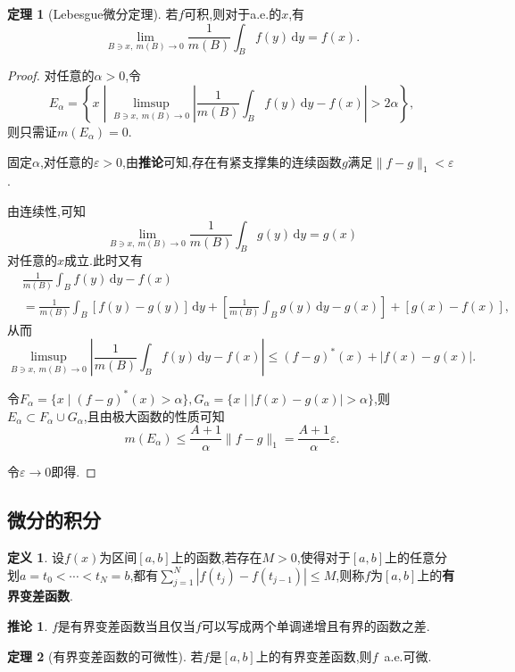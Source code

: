 \documentclass{ctexart}
\theoremstyle{definition}
\newtheorem{definition}{定义}
\newtheorem{theorem}{定理}
\newtheorem{corollary}{推论}
\theoremstyle{remark}
\begin{document}
	\begin{theorem}[Lebesgue微分定理]
		若$f$可积,则对于a.e.的$x$,有
		$$\lim_{B\ni x,\ m(B)\to 0}{\frac{1}{m(B)}\int_B{f(y)\,\mathrm{d}y}}=f(x).$$
	\end{theorem}
	\begin{proof}
		对任意的$\alpha>0$,令
		$$E_\alpha=\left\{x\middle|\limsup_{B\ni x,\ m(B)\to 0}{\left|\frac{1}{m(B)}\int_B{f(y)\,\mathrm{d}y}-f(x)\right|}>2\alpha\right\},$$
		则只需证$m(E_\alpha)=0$.
		
		固定$\alpha$,对任意的$\varepsilon>0$,由\textbf{推论\label{cor_Lp_dense_set}}可知,存在有紧支撑集的连续函数$g$满足$\|f-g\|_1<\varepsilon$.
		
		由连续性,可知
		$$\lim_{B\ni x,\ m(B)\to 0}{\frac{1}{m(B)}\int_B{g(y)\,\mathrm{d}y}}=g(x)$$
		对任意的$x$成立.此时又有
		\begin{align*}
			& \frac{1}{m(B)}\int_B{f(y)\,\mathrm{d}y}-f(x) \\
			& = \frac{1}{m(B)}\int_B{[f(y)-g(y)]\,\mathrm{d}y}
			+ \left[\frac{1}{m(B)}\int_B{g(y)\,\mathrm{d}y}-g(x)\right]
			+ [g(x)-f(x)],
		\end{align*}
		从而
		$$\limsup_{B\ni x,\ m(B)\to 0}{\left|\frac{1}{m(B)}\int_B{f(y)\,\mathrm{d}y}-f(x)\right|}
		\le (f-g)^*(x) + |f(x)-g(x)|.$$
		
		令$F_\alpha=\{x\mid(f-g)^*(x)>\alpha\},G_\alpha=\{x\mid|f(x)-g(x)|>\alpha\}$,则$E_\alpha\subset F_\alpha\cup G_\alpha$,且由极大函数的性质可知
		$$m(E_\alpha)\le\frac{A+1}{\alpha}\|f-g\|_1=\frac{A+1}{\alpha}\varepsilon.$$
		
		令$\varepsilon\to 0$即得.
	\end{proof}
	
	\subsection{微分的积分}
	
	\begin{definition}
		设$f(x)$为区间$[a,b]$上的函数,若存在$M>0$,使得对于$[a,b]$上的任意分划$a=t_0<\cdots<t_N=b$,都有$\sum_{j=1}^N{|f(t_j)-f(t_{j-1})|}\le M$,则称$f$为$[a,b]$上的\textbf{有界变差函数}.
	\end{definition}
	\begin{corollary}
		$f$是有界变差函数当且仅当$f$可以写成两个单调递增且有界的函数之差.
	\end{corollary}
	\begin{theorem}[有界变差函数的可微性]
		若$f$是$[a,b]$上的有界变差函数,则$f$\ a.e.可微.
	\end{theorem}
	
\end{document}
